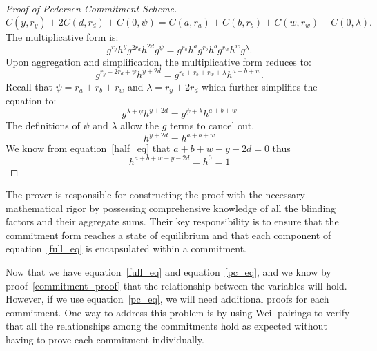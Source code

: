 \documentclass[version=preprint]{iacrcc}
\begin{document}
\begin{proof} [Proof of Pedersen Commitment Scheme]\label{commitment_proof}
\begin{equation}
C(y, r_{y}) + 2 C(d, r_{d}) + C(0, \psi) = C(a, r_{a}) + C(b, r_{b}) + C(w, r_{w}) + C(0, \lambda).
\end{equation}
The multiplicative form is:
\begin{equation}
g^{r_{y}} h^{y} g^{2 r_{d}} h^{2 d} g^{\psi} = g^{r_{a}} h^{a} g^{r_{b}} h^{b} g^{r_{w}} h^{w} g^{\lambda}.
\end{equation}
Upon aggregation and simplification, the multiplicative form reduces to:
\begin{equation}
\label{full_form}
g^{r_{y} + 2 r_{d} + \psi} h^{y + 2 d}  = g^{r_{a} + r_{b} + r_{w} + \lambda}  h^{a + b + w}.
\end{equation}
Recall that \( \psi = r_{a} + r_{b} + r_{w} \) and \( \lambda = r_{y} + 2r_{d} \) which further simplifies the equation to:
\begin{equation}
g^{\lambda + \psi} h^{y + 2 d}  = g^{\psi + \lambda}  h^{a + b + w}
\end{equation}
The definitions of \( \psi \) and \( \lambda \) allow the \( g \) terms to cancel out.
\begin{equation}
h^{y + 2 d} = h^{a + b + w}
\end{equation}
We know from equation~\ref{half_eq} that $a + b + w - y - 2d = 0$ thus
\begin{equation}
h^{a + b + w - y - 2 d} = h^{0} = 1
\end{equation}
\end{proof}

The prover is responsible for constructing the proof with the necessary mathematical rigor by possessing comprehensive knowledge of all the blinding factors and their aggregate sums. Their key responsibility is to ensure that the commitment form reaches a state of equilibrium and that each component of equation~\ref{full_eq} is encapsulated within a commitment.

Now that we have equation~\ref{full_eq} and equation~\ref{pc_eq}, and we know by proof~\ref{commitment_proof} that the relationship between the variables will hold. However, if we use equation~\ref{pc_eq}, we will need additional proofs for each commitment. One way to address this problem is by using Weil pairings to verify that all the relationships among the commitments hold as expected without having to prove each commitment individually.
\end{document}
